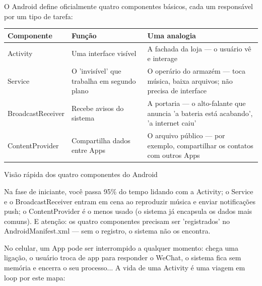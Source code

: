 


O Android define oficialmente quatro componentes básicos, cada um responsável por um tipo de tarefa:

\begin{center}
\begin{tabularx}{\linewidth}{|X|X|X|}
\hline
\textbf{Componente} & \textbf{Função} & \textbf{Uma analogia} \tabularnewline
\hline
Activity & Uma interface visível & A fachada da loja — o usuário vê e interage \tabularnewline
Service & O 'invisível' que trabalha em segundo plano & O operário do armazém — toca música, baixa arquivos; não precisa de interface \tabularnewline
BroadcastReceiver & Recebe avisos do sistema & A portaria — o alto-falante que anuncia 'a bateria está acabando', 'a internet caiu' \tabularnewline
ContentProvider & Compartilha dados entre Apps & O arquivo público — por exemplo, compartilhar os contatos com outros Apps \tabularnewline
\hline
\end{tabularx}
\end{center}

\begin{center}\small\color{gray}Visão rápida dos quatro componentes do Android\end{center}

Na fase de iniciante, você passa 95\% do tempo lidando com a Activity; o Service e o BroadcastReceiver entram em cena ao reproduzir música e enviar notificações push; o ContentProvider é o menos usado (o sistema já encapsula os dados mais comuns). E atenção: os quatro componentes precisam ser 'registrados' no AndroidManifest.xml — sem o registro, o sistema não os encontra.


No celular, um App pode ser interrompido a qualquer momento: chega uma ligação, o usuário troca de app para responder o WeChat, o sistema fica sem memória e encerra o seu processo... A vida de uma Activity é uma viagem em loop por este mapa:

